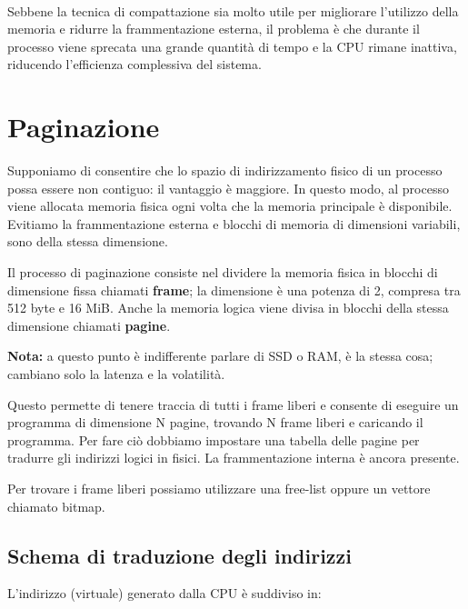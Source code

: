\paragraph{}
Sebbene la tecnica di compattazione sia molto utile per migliorare l'utilizzo della memoria e ridurre la frammentazione esterna, il problema è che durante il processo viene sprecata una grande quantità di tempo e la CPU rimane inattiva, riducendo l'efficienza complessiva del sistema.

\section{Paginazione}

Supponiamo di consentire che lo spazio di indirizzamento fisico di un processo possa essere non contiguo: il vantaggio è maggiore. In questo modo, al processo viene allocata memoria fisica ogni volta che la memoria principale è disponibile. Evitiamo la frammentazione esterna e blocchi di memoria di dimensioni variabili, sono della stessa dimensione.

Il processo di paginazione consiste nel dividere la memoria fisica in blocchi di dimensione fissa chiamati \textbf{frame}; la dimensione è una potenza di 2, compresa tra 512 byte e 16 MiB. Anche la memoria logica viene divisa in blocchi della stessa dimensione chiamati \textbf{pagine}.\newline
\noindent
\begin{tcolorbox}
  \textbf{Nota:} a questo punto è indifferente parlare di SSD o RAM, è la stessa cosa; cambiano solo la latenza e la volatilità.
\end{tcolorbox}

Questo permette di tenere traccia di tutti i frame liberi e consente di eseguire un programma di dimensione N pagine, trovando N frame liberi e caricando il programma. Per fare ciò dobbiamo impostare una tabella delle pagine per tradurre gli indirizzi logici in fisici.\newline
La frammentazione interna è ancora presente.

Per trovare i frame liberi possiamo utilizzare una free-list oppure un vettore chiamato bitmap.


\subsection{Schema di traduzione degli indirizzi}

L'indirizzo (virtuale) generato dalla CPU è suddiviso in:


